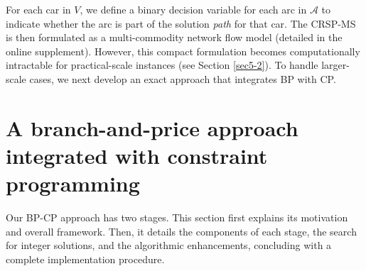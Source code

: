 \documentclass[12pt]{article}
\begin{document}

For each car in $V$, we define a binary decision variable for each arc in $\mathcal{A}$ to indicate whether the arc is part of the solution \textit{path} for that car. The CRSP-MS is then formulated as a multi-commodity network flow model (detailed in the online supplement). However, this compact formulation becomes computationally intractable for practical-scale instances (see Section \ref{sec5-2}). To handle larger-scale cases, we next develop an exact approach that integrates BP with CP.











\section{A branch-and-price approach integrated with constraint programming}\label{sec4}
Our BP-CP approach has two stages. This section first explains its motivation and overall framework. Then, it details the components of each stage, the search for integer solutions, and the algorithmic enhancements, concluding with a complete implementation procedure.
\end{document}
